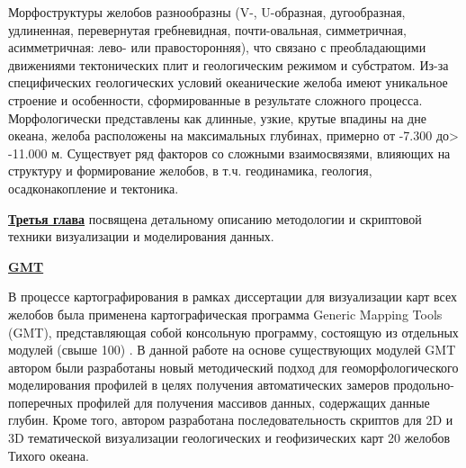 	Морфоструктуры желобов разнообразны (V-, U-образная, дугообразная, удлиненная, перевернутая гребневидная, почти-овальная, симметричная, асимметричная: лево- или правосторонняя), что связано с преобладающими движениями тектонических плит и геологическим режимом и субстратом. Из-за специфических геологических условий океанические желоба имеют уникальное строение и особенности, сформированные в результате сложного процесса. Морфологически представлены как длинные, узкие, крутые впадины на дне океана, желоба расположены на максимальных глубинах, примерно от -7.300 до> -11.000 м. Существует ряд факторов со сложными взаимосвязями, влияющих на структуру и формирование желобов, в т.ч. геодинамика, геология, осадконакопление и тектоника. 

\underline{\textbf{Третья глава}} посвящена детальному описанию методологии и скриптовой техники визуализации и моделирования данных.

\underline{\textbf{GMT}} 

В процессе картографирования в рамках диссертации для визуализации карт всех желобов была применена картографическая программа Generic Mapping Tools (GMT), представляющая собой консольную программу, состоящую из отдельных модулей (свыше 100) \cite{WesselSmith1995}. В данной работе на основе существующих модулей GMT автором были разработаны новый методический подход для геоморфологического моделирования профилей в целях получения автоматических замеров продольно-поперечных профилей для получения массивов данных, содержащих данные глубин. Кроме того, автором разработана последовательность скриптов для 2D и 3D тематической визуализации геологических и геофизических карт 20 желобов Тихого океана. 

